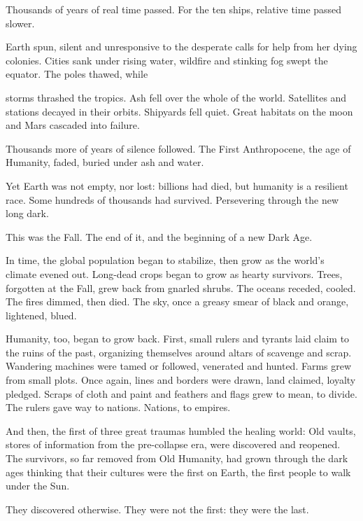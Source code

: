 Thousands of years of real time passed. For the ten ships, relative time passed slower. 
 

Earth spun, silent and unresponsive to the desperate calls for help from her dying colonies. Cities  
sank under rising water, wildfire and stinking fog swept the equator. The poles thawed, while  

                                                                                                                  


storms thrashed the tropics. Ash fell over the whole of the world. Satellites and stations decayed  
in their orbits. Shipyards fell quiet. Great habitats on the moon and Mars cascaded into failure.  
 

Thousands more of years of silence followed. The First Anthropocene, the age of Humanity,  
faded, buried under ash and water. 
 

Yet Earth was not empty, nor lost: billions had died, but humanity is a resilient race. Some  
hundreds of thousands had survived. Persevering through the new long dark. 
 

This was the Fall. The end of it, and the beginning of a new Dark Age. 
 

In time, the global population began to stabilize, then grow as the world’s climate evened out.  
Long-dead crops began to grow as hearty survivors. Trees, forgotten at the Fall, grew back from  
gnarled shrubs. The oceans receded, cooled. The fires dimmed, then died. The sky, once a  
greasy smear of black and orange, lightened, blued.   
 

Humanity, too, began to grow back. First, small rulers and tyrants laid claim to the ruins of the  
past, organizing themselves around altars of scavenge and scrap. Wandering machines were  
tamed or followed, venerated and hunted. Farms grew from small plots. Once again, lines and  
borders were drawn, land claimed, loyalty pledged. Scraps of cloth and paint and feathers and  
flags grew to mean, to divide. The rulers gave way to nations. Nations, to empires. 
 

And then, the first of three great traumas humbled the healing world: Old vaults, stores of  
information from the pre-collapse era, were discovered and reopened. The survivors, so far  
removed from Old Humanity, had grown through the dark ages thinking that their cultures were  
the first on Earth, the first people to walk under the Sun. 
 

They discovered otherwise. They were not the first: they were the last. 
 

